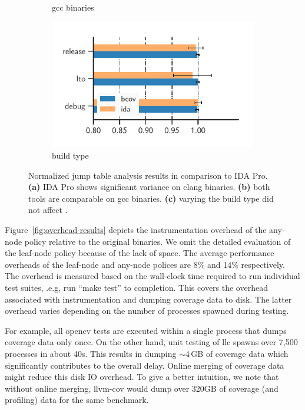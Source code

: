 \begin{figure}[t!]
\begin{subfigure}[t]{0.28\textwidth}
		\caption{\textsf{gcc} binaries}
		\label{fig:jumptab-gcc}
	\end{subfigure}
	\hspace{10pt}
	\begin{subfigure}[t]{0.28\textwidth}
		\includegraphics[clip, trim=0.48cm 0.38cm 1.6cm 0.8cm, width=\textwidth]{fig/jumptab-build}
		\caption{build type}
		\label{fig:jumptab-build-type}
	\end{subfigure}
	
	\caption{Normalized jump table analysis results in comparison to IDA Pro. \textbf{(a)} IDA Pro shows significant  variance on \textsf{clang} binaries. \textbf{(b)} both tools are comparable on \textsf{gcc} binaries. \textbf{(c)} varying the build type did not affect {\bcov}.}
	\label{fig:jumptab-results}
\end{figure}

Figure~\ref{fig:overhead-results} depicts the instrumentation overhead of the any-node policy relative to the original binaries. 
We omit the detailed evaluation of the leaf-node policy because of the lack of space.
The average performance overheads of the leaf-node and any-node polices are 8\% and 14\% respectively.
The overhead is measured based on the wall-clock time required to run individual test suites, .e.g, run ``\textsf{make test}'' to completion.
This covers the overhead associated with instrumentation and dumping coverage data to disk.
The latter overhead varies depending on the number of processes spawned during testing.

For example, all \textsf{opencv} tests are executed within a single process that dumps coverage data only once.
On the other hand, unit testing of \textsf{llc} spawns over 7,500 processes in about 40s.
This results in dumping $\sim$4\,GB of coverage data which significantly contributes to the overall delay.
Online merging of coverage data might reduce this disk IO overhead.
To give a better intuition, we note that without online merging, \textsf{llvm-cov} would dump over 320GB of coverage (and profiling) data for the same benchmark. 

